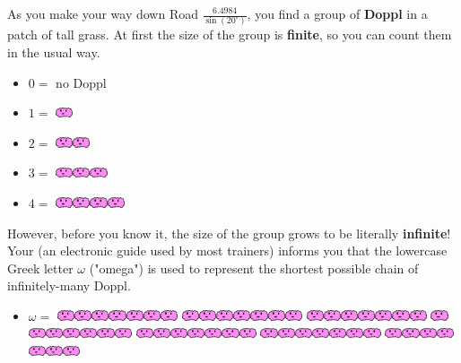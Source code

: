 

\newcommand{\mappDoppl}{\includegraphics[height=0.12in]{assets/doppl.pdf}}
\newcommand{\mappDopplOmega}{\includegraphics[height=0.12in]{assets/doppl-omega.pdf}}
\newcommand{\mappDopplOmegaSquared}{\includegraphics[height=0.12in]{assets/doppl-omega2.pdf}}

As you make your way down Road \(\frac{6.4984}{\sin(20^\circ)}\), you find a
group of \textbf{Doppl} \mappMobidot{} in a patch of tall grass.
At first the size of the group is \textbf{finite}, so you can count them
in the usual way.

\begin{itemize}
\item \(0=\) no Doppl

\item \(1=\) \mappDoppl

\item \(2=\) \mappDoppl\mappDoppl

\item \(3=\) \mappDoppl\mappDoppl\mappDoppl

\item \(4=\) \mappDoppl\mappDoppl\mappDoppl\mappDoppl
\end{itemize}

However, before you know it, the size of the group grows to
be literally \textbf{infinite}! Your \mappMobidex{} (an electronic
guide used by most \mappMobidash{} trainers)
informs you that the lowercase Greek letter \(\omega\)
("omega") is used
to represent the shortest possible chain of infinitely-many Doppl.

\begin{itemize}
  \item \(\omega=\)
  \mappDoppl\mappDoppl\mappDoppl\mappDoppl\mappDoppl\mappDoppl\mappDoppl
  \mappDoppl\mappDoppl\mappDoppl\mappDoppl\mappDoppl\mappDoppl\mappDoppl
  \mappDoppl\mappDoppl\mappDoppl\mappDoppl\mappDoppl\mappDoppl\mappDoppl
  \mappDoppl\mappDoppl\mappDoppl\mappDoppl\mappDoppl\mappDoppl\mappDoppl
  \mappDoppl\mappDoppl\mappDoppl\mappDoppl\mappDoppl\mappDoppl\mappDoppl
  \mappDoppl\mappDoppl\mappDoppl\mappDoppl\mappDoppl\mappDoppl\mappDoppl
  \mappDoppl\mappDoppl\mappDoppl\mappDoppl\mappDoppl\mappDoppl\mappDoppl
\end{itemize}

